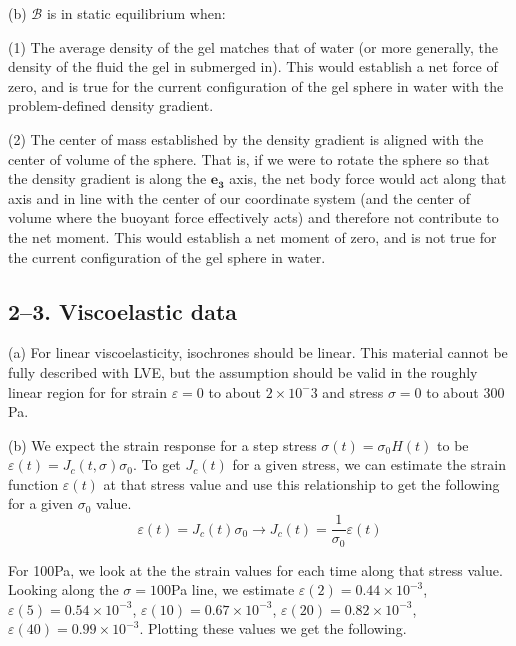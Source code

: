 \documentclass[preprint,12pt,authoryear]{elsarticle}
\begin{document}
(b) $\mathcal{B}$ is in static equilibrium when:

(1) The average density of the gel matches that of water (or more generally, the density of the fluid the gel in submerged in). This would establish a net force of zero, and is true for the current configuration of the gel sphere in water with the problem-defined density gradient.

(2) The center of mass established by the density gradient is aligned with the center of volume of the sphere. That is, if we were to rotate the sphere so that the density gradient is along the $\bm{e_3}$ axis, the net body force would act along that axis and in line with the center of our coordinate system (and the center of volume where the buoyant force effectively acts) and therefore not contribute to the net moment. This would establish a net moment of zero, and is not true for the current configuration of the gel sphere in water.

\bigskip
\subsection*{2--3. \textbf{Viscoelastic data}} 

\medskip
(a) For linear viscoelasticity, isochrones should be linear. This material cannot be fully described with LVE, but the assumption should be valid in the roughly linear region for for strain $\varepsilon = 0$ to about $2 \times 10^-3$ and stress $\sigma = 0$ to about 300 Pa.

\medskip
(b) We expect the strain response for a step stress $\sigma(t) = \sigma_0 H(t)$ to be $\varepsilon(t) = J_c(t,\sigma)\sigma_0$. To get $J_c(t)$ for a given stress, we can estimate the strain function $\varepsilon(t)$ at that stress value and use this relationship to get the following for a given $\sigma_0$ value.
\begin{equation}
    \varepsilon(t) = J_c(t)\sigma_0 \to J_c(t) = \frac{1}{\sigma_0} \varepsilon(t)
\end{equation}

For 100Pa, we look at the the strain values for each time along that stress value. Looking along the $\sigma = 100$Pa line, we estimate $\varepsilon(2) = 0.44 \times 10^{-3}$, $\varepsilon(5) = 0.54 \times 10^{-3}$, $\varepsilon(10) = 0.67 \times 10^{-3}$, $\varepsilon(20) = 0.82 \times 10^{-3}$, $\varepsilon(40) = 0.99 \times 10^{-3}$. Plotting these values we get the following.
\end{document}
